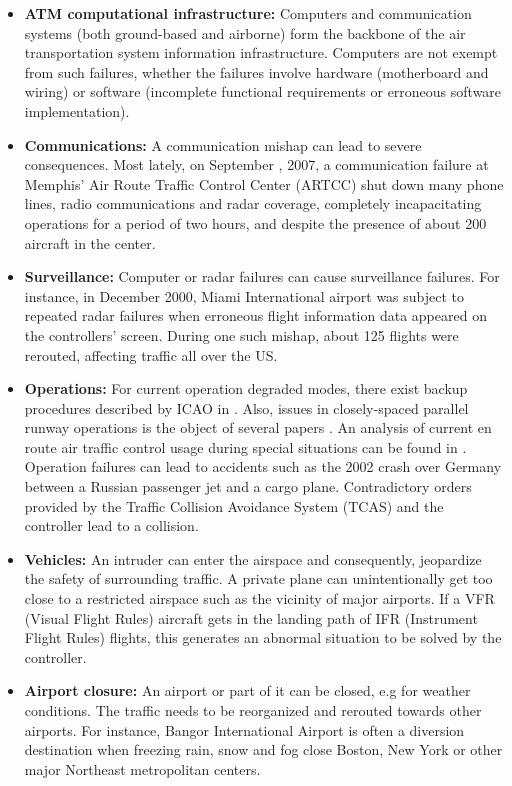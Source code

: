 \documentclass[a4paper, 10pt]{IEEEtran}
\begin{document}
\begin{itemize}
 \item \textbf{ATM computational infrastructure: } Computers and
communication systems (both ground-based and airborne) form the backbone of
the air transportation system information infrastructure. Computers are not
exempt from such failures, whether the failures involve hardware
(motherboard and wiring) or software (incomplete functional requirements or
erroneous software implementation).
\item\textbf{Communications:} A communication mishap can lead to severe
consequences. Most lately, on September , 2007, a communication
failure at Memphis' Air Route Traffic Control Center (ARTCC) shut down many phone lines, radio communications
and radar coverage, completely incapacitating operations  for a period
of two hours, and despite the presence of about 200 aircraft in the center.
\item\textbf{Surveillance:} Computer or radar failures can cause
surveillance failures. For instance, in December 2000, Miami International
airport was subject to repeated radar failures when erroneous flight
information data appeared on the controllers' screen. During one such
mishap, about 125 flights were rerouted, affecting traffic all over the US.
\item \textbf{Operations:} For current operation degraded modes, there
exist backup procedures described by ICAO in  \cite{ICAO4444}. Also, issues in closely-spaced parallel runway operations is the object of several papers \cite{pritchett3, pritchett1}. An analysis of current en route air traffic control usage during special situations can be found in \cite{ATCspecialSituations}. Operation failures can lead to accidents such as  the 2002 crash over Germany between a Russian passenger jet and a cargo plane. Contradictory orders provided by the Traffic Collision Avoidance System (TCAS) and the controller lead to a collision. 
\item \textbf{Vehicles:} An intruder can enter the airspace and
consequently, jeopardize the safety of surrounding traffic. A private plane
can unintentionally  get too close to a restricted airspace such as the
vicinity of major airports. If a VFR (Visual Flight Rules) aircraft gets in
the landing path of IFR (Instrument Flight Rules) flights, this generates
an abnormal situation to be solved by the controller.
\item \textbf{Airport closure:}  An airport or part of it can be closed,
e.g for weather conditions. The traffic needs to be reorganized and
rerouted towards other airports. For instance, Bangor International Airport
is often a diversion destination when freezing rain, snow and fog close
Boston, New York or other major Northeast metropolitan centers.
\end{itemize}
\end{document}
